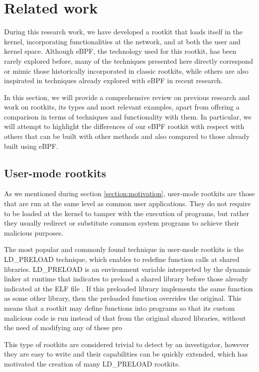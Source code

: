 \chapter{Related work} \label{chapter:related_work}
During this research work, we have developed a rootkit that loads itself in the kernel, incorporating functionalities at the network, and at both the user and kernel space. Although eBPF, the technology used for this rootkit, has been rarely explored before, many of the techniques presented here directly correspond or mimic those historically incorporated in classic rootkits, while others are also inspirated in techniques already explored with eBPF in recent research. 

In this section, we will provide a comprehensive review on previous research and work on rootkits, its types and most relevant examples, apart from offering a comparison in terms of techniques and functionality with them. In particular, we will attempt to highlight the differences of our eBPF rootkit with respect with others that can be built with other methods and also compared to those already built using eBPF.

\section{User-mode rootkits}
As we mentioned during section \ref{section:motivation}, user-mode rootkits are those that are run at the same level as common user applications. They do not require to be loaded at the kernel to tamper with the execution of programs, but rather they usually redirect or substitute common system programs to achieve their malicious purposes.

The most popular and commonly found technique in user-mode rootkits is the LD\_PRELOAD technique, which enables to redefine function calls at shared libraries. LD\_PRELOAD is an environment variable interpreted by the dynamic linker at runtime that indicates to preload a shared library before those already indicated at the ELF file \cite{ldpreload_pros}. If this preloaded library implements the same function as some other library, then the preloaded function overrides the original. This means that a rootkit may define functions into programs so that its custom malicious code is run instead of that from the original shared libraries, without the need of modifying any of these pro

This type of rootkits are considered trivial to detect by an investigator, however they are easy to write and their capabilities can be quickly extended, which has motivated the creation of many LD\_PRELOAD rootkits.

